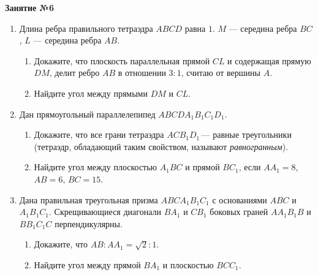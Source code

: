 \documentclass[12pt, a4paper]{article}
\begin{document}
	
   \cfoot{}
\begin{center}
	\Large
	\textbf{Занятие №6}
\end{center}
\begin{enumerate}[label=\textbf{\arabic*.}]
	\item Длина ребра правильного тетраэдра $ABCD$ равна $1$. $M$ --- середина ребра $BC$, $L$ --- середина ребра $AB$.
	\begin{enumerate}[label=\asbuk*)]
		\item Докажите, что плоскость параллельная прямой $CL$ и содержащая прямую $DM$, делит ребро $AB$ в отношении $3 : 1$, считаю от вершины $A$.
		\item Найдите угол между прямыми $DM$ и $CL$.
	\end{enumerate}
	\item Дан прямоугольный параллелепипед $ABCDA_1B_1C_1D_1$.
	\begin{enumerate}[label=\asbuk*)]
		\item Докажите, что все грани тетраэдра $ACB_1D_1$ — равные треугольники (тетраэдр, обладающий таким свойством, называют \textit{равногранным}).
		\item Найдите угол между плоскостью $A_1BC$ и прямой $BC_1$, если $AA_1 = 8$, $AB = 6$, $BC = 15$.
	\end{enumerate}
	\item Дана правильная треугольная призма $ABCA_1B_1C_1$ с основаниями $ABC$ и $A_1B_1C_1$. Скрещивающиеся диагонали $BA_1$ и $CB_1$ боковых граней $AA_1B_1B$ и $BB_1C_1C$ перпендикулярны.
	\begin{enumerate}[label=\asbuk*)]
		\item Докажите, что $AB : AA_1 =\sqrt{2} : 1$.
		\item Найдите угол между прямой $BA_1$ и плоскостью $BCC_1$.
	\end{enumerate}
\end{enumerate}
\end{document}
